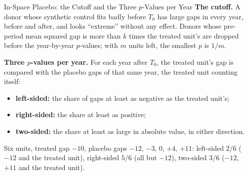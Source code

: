 \documentclass[main.tex]{subfiles}
\begin{document}
\begin{frame}{In-Space Placebo: the Cutoff and the Three $p$-Values per Year}
  \small
  \textbf{The cutoff.} A donor whose synthetic control fits badly before
  $T_0$ has large gaps in every year, before and after, and looks
  ``extreme'' without any effect. Donors whose pre-period mean squared gap is more than
  $k$ times the treated unit's are dropped before the year-by-year
  $p$-values; with $m$ units left, the smallest $p$ is $1/m$.
  \medskip

  \textbf{Three $p$-values per year.} For each year after $T_0$, the treated
  unit's gap is compared with the placebo gaps of that same year, the treated
  unit counting itself:
  \begin{itemize}\small
    \item \textbf{left-sided:} the share of gaps at least as negative as the
      treated unit's;
    \item \textbf{right-sided:} the share at least as positive;
    \item \textbf{two-sided:} the share at least as large in absolute value,
      in either direction.
  \end{itemize}
  \medskip
  Six units, treated gap $-10$, placebo gaps $-12$, $-3$, $0$, $+4$, $+11$:
  left-sided $2/6$ ($-12$ and the treated unit), right-sided $5/6$ (all but
  $-12$), two-sided $3/6$ ($-12$, $+11$ and the treated unit).
\end{frame}
\end{document}
